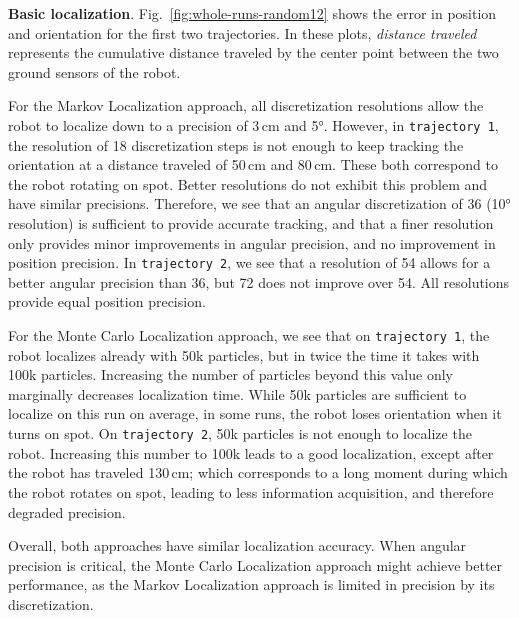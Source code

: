 \documentclass{svmult}
\newcommand{\Fig}[1]{Fig.~\ref{fig:#1}}
\begin{document}
\textbf{Basic localization}.
\Fig{whole-runs-random12} shows the error in position and orientation for the first two trajectories.
In these plots, \emph{distance traveled} represents the cumulative distance traveled by the center point between the two ground sensors of the robot.

For the Markov Localization approach, all discretization resolutions allow the robot to localize down to a precision of 3\,cm and 5°.
However, in \texttt{trajectory~1}, the resolution of 18 discretization steps is not enough to keep tracking the orientation at a distance traveled of 50\,cm and 80\,cm.
These both correspond to the robot rotating on spot.
Better resolutions do not exhibit this problem and have similar precisions.
Therefore, we see that an angular discretization of 36 (10° resolution) is sufficient to provide accurate tracking, and that a finer resolution only provides minor improvements in angular precision, and no improvement in position precision.
In \texttt{trajectory~2}, we see that a resolution of 54 allows for a better angular precision than 36, but 72 does not improve over 54.
All resolutions provide equal position precision.

For the Monte Carlo Localization approach, we see that on \texttt{trajectory~1}, the robot localizes already with 50k particles, but in twice the time it takes with 100k particles.
Increasing the number of particles beyond this value only marginally decreases localization time.
While 50k particles are sufficient to localize on this run on average, in some runs, the robot loses orientation when it turns on spot.
On \texttt{trajectory~2}, 50k particles is not enough to localize the robot.
Increasing this number to 100k leads to a good localization, except after the robot has traveled 130\,cm; which corresponds to a long moment during which the robot rotates on spot, leading to less information acquisition, and therefore degraded precision.

Overall, both approaches have similar localization accuracy.
When angular precision is critical, the Monte Carlo Localization approach might achieve better performance, as the Markov Localization approach is limited in precision by its discretization.

\end{document}
